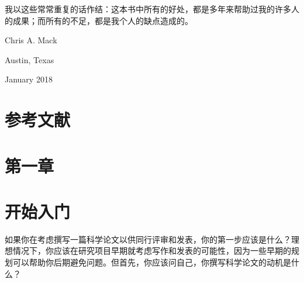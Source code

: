 我以这些常常重复的话作结：这本书中所有的好处，都是多年来帮助过我的许多人的成果；而所有的不足，都是我个人的缺点造成的。

Chris A. Mack

Austin, Texas

January 2018


\section*{参考文献}


\section*{第一章}
\section*{开始入门}
如果你在考虑撰写一篇科学论文以供同行评审和发表，你的第一步应该是什么？理想情况下，你应该在研究项目早期就考虑写作和发表的可能性，因为一些早期的规划可以帮助你后期避免问题。但首先，你应该问自己，你撰写科学论文的动机是什么？

